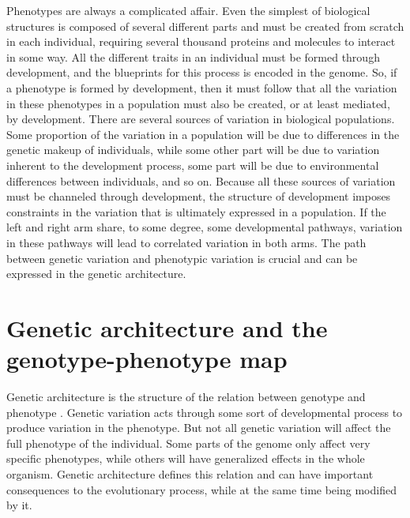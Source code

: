 \begin{refsection}
Phenotypes are always a complicated affair. Even the simplest of
biological structures is composed of several different parts and must be
created from scratch in each individual, requiring several thousand
proteins and molecules to interact in some way. All the different traits
in an individual must be formed through development, and the blueprints
for this process is encoded in the genome. So, if a phenotype is formed
by development, then it must follow that all the variation in these
phenotypes in a population must also be created, or at least mediated,
by development. There are several sources of variation in biological
populations. Some proportion of the variation in a population will be
due to differences in the genetic makeup of individuals, while some
other part will be due to variation inherent to the development process,
some part will be due to environmental differences between individuals,
and so on. Because all these sources of variation must be channeled
through development, the structure of development imposes constraints in
the variation that is ultimately expressed in a population. If the left
and right arm share, to some degree, some developmental pathways,
variation in these pathways will lead to correlated variation in both
arms. The path between genetic variation and phenotypic variation is
crucial and can be expressed in the genetic architecture.

\section{Genetic architecture and the genotype-phenotype map}
Genetic architecture is
the structure of the relation between genotype and phenotype
\parencite{Hansen2006-ct}. Genetic variation acts through some sort of
developmental process to produce variation in the phenotype. But not all
genetic variation will affect the full phenotype of the individual. Some
parts of the genome only affect very specific phenotypes, while others
will have generalized effects in the whole organism. Genetic
architecture defines this relation and can have important consequences
to the evolutionary process, while at the same time being modified by
it.


\end{refsection}
